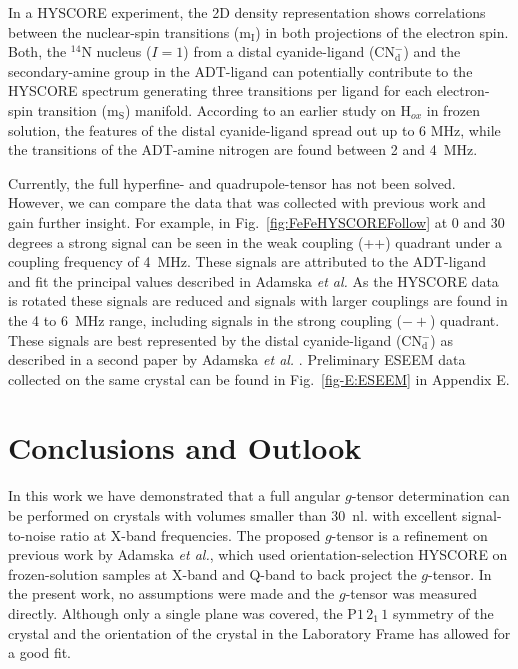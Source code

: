 In a HYSCORE experiment, the 2D density representation shows correlations between the nuclear-spin transitions (m$_\text{I}$) in both projections of the electron spin. Both, the $^{14}$N nucleus ($I=1$) from a distal cyanide-ligand (CN$_\text{d}^-$) and the secondary-amine group in the ADT-ligand can potentially contribute to the HYSCORE spectrum generating three transitions per ligand for each electron-spin transition (m$_\text{S}$) manifold. According to an earlier study on H$_{ox}$ in frozen solution, the features of the distal cyanide-ligand spread out up to 6 MHz, while the transitions of the ADT-amine nitrogen are found between 2 and 4~MHz. \cite{Adamska2015,Adamska2015pdt}

Currently, the full hyperfine- and quadrupole-tensor has not been solved. However, we can compare the data that was collected with previous work and gain further insight. For example, in Fig.~\ref{fig:FeFeHYSCOREFollow} at 0 and 30 degrees a strong signal can be seen in the weak coupling (++) quadrant under a coupling frequency of 4~MHz. These signals are attributed to the ADT-ligand and fit the principal values described in Adamska \textit{ et al.} \cite{Adamska2015pdt} As the HYSCORE data is rotated these signals are reduced and signals with larger couplings are found in the 4 to 6~MHz range, including signals in the strong coupling ($-+$) quadrant. These signals are best represented by the distal cyanide-ligand (CN$_\text{d}^-$) as described in a second paper by Adamska\textit{ et al.} \cite{Adamska2015}. Preliminary ESEEM data collected on the same crystal can be found in Fig.~\ref{fig-E:ESEEM} in Appendix E.

\section{Conclusions and Outlook}
In this work we have demonstrated that a full angular $g$-tensor determination can be performed on crystals with volumes smaller than 30~nl. with excellent signal-to-noise ratio at X-band frequencies. The proposed $g$-tensor is a refinement on previous work by Adamska \textit{et al.}, which used orientation-selection HYSCORE on frozen-solution samples at X-band and Q-band to back project the $g$-tensor. In the present work, no assumptions were made and the $g$-tensor was measured directly. Although only a single plane was covered, the P$1\,2_1\,1$ symmetry of the crystal and the orientation of the crystal in the Laboratory Frame has allowed for a good fit. 

